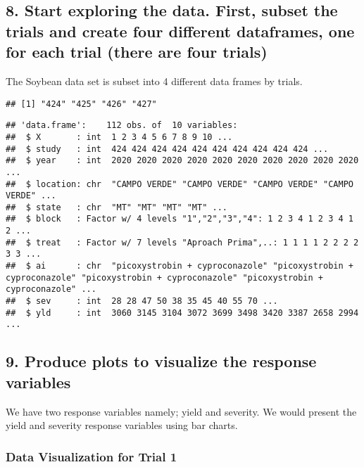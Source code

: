 \documentclass[
]{article}
\begin{document}
\hypertarget{start-exploring-the-data.-first-subset-the-trials-and-create-four-different-dataframes-one-for-each-trial-there-are-four-trials}{%
\subsection{8. Start exploring the data. First, subset the trials and
create four different dataframes, one for each trial (there are four
trials)}\label{start-exploring-the-data.-first-subset-the-trials-and-create-four-different-dataframes-one-for-each-trial-there-are-four-trials}}

The Soybean data set is subset into 4 different data frames by trials.

\begin{verbatim}
## [1] "424" "425" "426" "427"
\end{verbatim}

\begin{verbatim}
## 'data.frame':    112 obs. of  10 variables:
##  $ X       : int  1 2 3 4 5 6 7 8 9 10 ...
##  $ study   : int  424 424 424 424 424 424 424 424 424 424 ...
##  $ year    : int  2020 2020 2020 2020 2020 2020 2020 2020 2020 2020 ...
##  $ location: chr  "CAMPO VERDE" "CAMPO VERDE" "CAMPO VERDE" "CAMPO VERDE" ...
##  $ state   : chr  "MT" "MT" "MT" "MT" ...
##  $ block   : Factor w/ 4 levels "1","2","3","4": 1 2 3 4 1 2 3 4 1 2 ...
##  $ treat   : Factor w/ 7 levels "Aproach Prima",..: 1 1 1 1 2 2 2 2 3 3 ...
##  $ ai      : chr  "picoxystrobin + cyproconazole" "picoxystrobin + cyproconazole" "picoxystrobin + cyproconazole" "picoxystrobin + cyproconazole" ...
##  $ sev     : int  28 28 47 50 38 35 45 40 55 70 ...
##  $ yld     : int  3060 3145 3104 3072 3699 3498 3420 3387 2658 2994 ...
\end{verbatim}

\hypertarget{produce-plots-to-visualize-the-response-variables}{%
\subsection{9. Produce plots to visualize the response
variables}\label{produce-plots-to-visualize-the-response-variables}}

We have two response variables namely; yield and severity. We would
present the yield and severity response variables using bar charts.

\hypertarget{data-visualization-for-trial-1}{%
\subsubsection{Data Visualization for Trial
1}\label{data-visualization-for-trial-1}}
\end{document}
